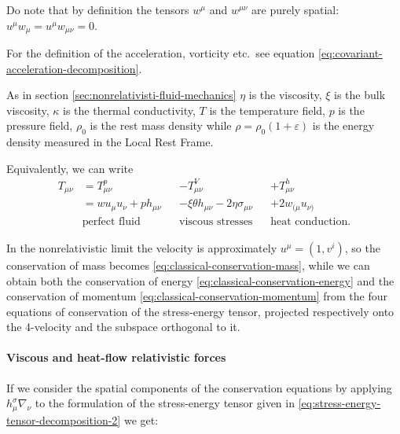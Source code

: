 \documentclass[main.tex]{subfiles}
\begin{document}
Do note that by definition the tensors \(w^\mu\) and \(w^{\mu\nu}\) are purely spatial: \(u^\mu w_\mu = u^\mu w_{\mu \nu} = 0\).

For the definition of the acceleration, vorticity etc.\ see equation \eqref{eq:covariant-acceleration-decomposition}.

As in section \ref{sec:nonrelativisti-fluid-mechanics} \(\eta\) is the viscosity, \(\xi\) is the bulk viscosity,  \(\kappa\) is the thermal conductivity, \(T\) is the temperature field, \(p\) is the pressure field, \(\rho_0\) is the rest mass density while \(\rho = \rho_0 (1 + \varepsilon)\) is the energy density measured in the Local Rest Frame.


Equivalently, we can write
\begin{subequations} \label{eq:stress-energy-tensor-decomposition-2}
\begin{align}
  T_{\mu\nu} &= T_{\mu\nu}^p && - T_{\mu\nu}^V &&+ T_{\mu\nu}^h  \\
  &= w u_\mu u_\nu + p h_{\mu\nu} &&-\xi \theta h_{\mu\nu} - 2 \eta \sigma_{\mu\nu} &&+2w_{(\mu} u_{\nu)}  \\
  &\text{perfect fluid} && \text{viscous stresses} && \text{heat conduction.} \nonumber
\end{align}
\end{subequations}

In the nonrelativistic limit the velocity is approximately \(u^\mu = (1, v^i)\), so the conservation of mass becomes \eqref{eq:classical-conservation-mass}, while we can obtain both
the conservation of energy \eqref{eq:classical-conservation-energy}
and the conservation of momentum \eqref{eq:classical-conservation-momentum}
from the four equations of conservation of the stress-energy tensor, projected respectively onto the 4-velocity and the subspace orthogonal to it.

\paragraph{Viscous and heat-flow relativistic forces}

If we consider the spatial components of the conservation equations by applying \(h^\sigma_\mu \nabla_\nu\) to the formulation of the stress-energy tensor given in \eqref{eq:stress-energy-tensor-decomposition-2} we get:
\end{document}
